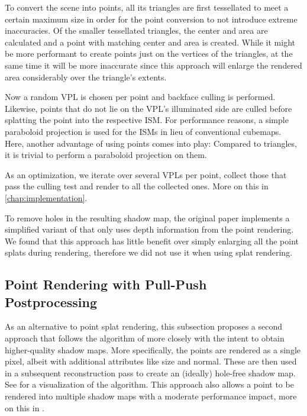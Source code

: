 To convert the scene into points, all its triangles are first tessellated to meet a certain maximum size in order for the point conversion to not introduce extreme inaccuracies. Of the smaller tessellated triangles, the center and area are calculated and a point with matching center and area is created. While it might be more performant to create points just on the vertices of the triangles, at the same time it will be more inaccurate since this approach will enlarge the rendered area considerably over the triangle's extents.

Now a random VPL is chosen per point and backface culling is performed. Likewise, points that do not lie on the VPL's illuminated side are culled before splatting the point into the respective ISM. For performance reasons, a simple paraboloid projection is used for the ISMs in lieu of conventional cubemaps. Here, another advantage of using points comes into play: Compared to triangles, it is trivial to perform a paraboloid projection on them.

As an optimization, we iterate over several VPLs per point, collect those that pass the culling test and render to all the collected ones. More on this in \cref{chap:implementation}.

To remove holes in the resulting shadow map, the original paper implements a simplified variant of \citet{Marroquim:2007:reconstruction} that only uses depth information from the point rendering. We found that this approach has little benefit over simply enlarging all the point splats during rendering, therefore we did not use it when using splat rendering.



\subsection{Point Rendering with Pull-Push Postprocessing}

As an alternative to point splat rendering, this subsection proposes a second approach that follows the algorithm of \citet{Marroquim:2007:reconstruction} more closely with the intent to obtain higher-quality shadow maps. More specifically, the points are rendered as a single pixel, albeit with additional attributes like size and normal. These are then used in a subsequent reconstruction pass to create an (ideally) hole-free shadow map. See  for a visualization of the algorithm. This approach also allows a point to be rendered into multiple shadow maps with a moderate performance impact, more on this in .


